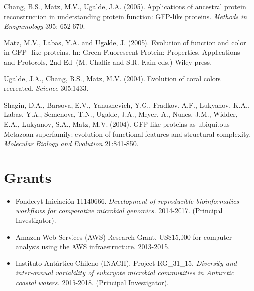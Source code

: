 \documentclass[10pt,letterpaper]{article}
\begin{document}
\begin{etaremune}
\item Chang, B.S., Matz, M.V., Ugalde, J.A. (2005). Applications of ancestral protein reconstruction in understanding protein function: GFP-like proteins. \textit{Methods in Enzynmology} 395: 652-670.

\item Matz, M.V., Labas, Y.A. and Ugalde, J. (2005). Evolution of function and color in GFP- like proteins. In: Green Fluorescent Protein: Properties, Applications and Protocols, 2nd Ed. (M. Chalfie and S.R. Kain eds.) Wiley press.

\item Ugalde, J.A., Chang, B.S., Matz, M.V. (2004). Evolution of coral colors recreated. \textit{Science} 305:1433.

\item Shagin, D.A., Barsova, E.V., Yanushevich, Y.G., Fradkov, A.F., Lukyanov, K.A., Labas, Y.A., Semenova, T.N., Ugalde, J.A., Meyer, A., Nunes, J.M., Widder, E.A., Lukyanov, S.A., Matz, M.V. (2004). GFP-like proteins as ubiquitous Metazoan superfamily: evolution of functional features and structural complexity. \textit{Molecular Biology and Evolution} 21:841-850.

\end{etaremune}



\section*{Grants}

\begin{itemize}
\item Fondecyt Iniciaci\'on 11140666. \textit{Development of reproducible bioinformatics workflows for comparative microbial genomics.} 2014-2017. (Principal Investigator). 

\item Amazon Web Services (AWS) Research Grant. US\$15,000 for computer analysis using the AWS infraestructure. 2013-2015.

\item Instituto Ant\'artico Chileno (INACH). Project RG\_31\_15. \textit{Diversity and inter-annual variability of eukaryote microbial communities in Antarctic coastal waters.} 2016-2018. (Principal Investigator).


\end{itemize}
\end{document}
